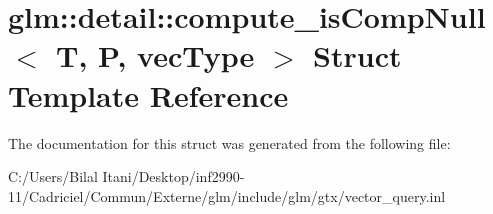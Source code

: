 \hypertarget{structglm_1_1detail_1_1compute__is_comp_null}{}\section{glm\+:\+:detail\+:\+:compute\+\_\+is\+Comp\+Null$<$ T, P, vec\+Type $>$ Struct Template Reference}
\label{structglm_1_1detail_1_1compute__is_comp_null}


The documentation for this struct was generated from the following file\+:\begin{DoxyCompactItemize}
\item 
C\+:/\+Users/\+Bilal Itani/\+Desktop/inf2990-\/11/\+Cadriciel/\+Commun/\+Externe/glm/include/glm/gtx/vector\+\_\+query.\+inl\end{DoxyCompactItemize}
